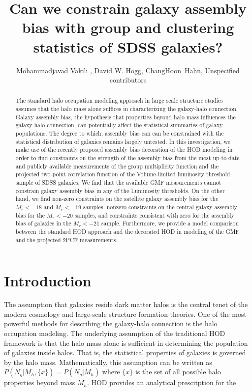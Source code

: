 \documentclass[14pt, preprint]{emulateapj}
\begin{document}
\title{Can we constrain galaxy assembly bias with group and clustering statistics of SDSS galaxies?}
\author{Mohammadjavad Vakili , David W. Hogg, ChangHoon~Hahn, Unspecified contributors}
\begin{abstract}

The standard halo occupation modeling approach in large scale structure 
studies assumes that the halo mass alone suffices in characterizing the 
galaxy-halo connection. Galaxy assembly bias, the hypothesis that properties beyond 
halo mass influences the galaxy-halo connection, can potentially affect the 
statistical summaries of galaxy populations. The degree to which, assembly bias can 
can be constrained with the statistical distribution of galaxies remains largely 
untested. In this investigation, we make use of the recently proposed assembly bias decoration 
of the HOD modeling in order to find constraints on the strength of the assembly bias from the most up-to-date and publicly available measurements of the group multiplicity function and the projected two-point correlation function of the Volume-limited luminosity threshold sample of SDSS 
galaxies. We find that the available GMF measurements cannot constrain galaxy assembly bias in any of the Luminosity thresholds. On the other hand, we find non-zero constraints on the satellite galaxy assembly bias for the $M_{r}<-18$ and $M_{r}<-19$ samples, nonzero constraints on the central galaxy assembly bias for the $M_{r}<-20$ samples, and constraints consistent with zero for the assembly bias of galaxies in the $M_{r}<-21$ sample. Furthermore, we provide a model comparison between the standard HOD approach and the decorated HOD in modeling of the GMF and the projected 2PCF measurements.

\end{abstract}

\section{Introduction}
The assumption that galaxies reside dark matter halos 
is the central tenet of the modern cosmology and 
large-scale structure formation theories. 
One of the most powerful methods for describing 
the galaxy-halo connection is the halo occupation modeling. 
The underlying assumption of the traditional HOD framework is 
that the halo mass alone is sufficient in determining the
population of galaxies inside halos. That is, the statistical properties of 
galaxies is governed by the halo mass. Mathematically, this assumption can be 
written as $P(N_g|M_h,\{x\})=P(N_g|M_h)$ where $\{x\}$ is the set of all 
possible halo properties beyond mass $M_{h}$. HOD provides an analytical prescription for the  
\end{document}
